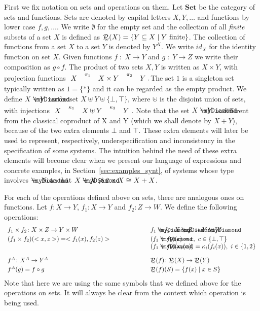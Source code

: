 \documentclass{LMCS}
\def\pow{{\mathcal P_{\!\!\!\omega}}}
\newcommand{\myplus}{\mathbin{\rlap{$\myDiamond$}\hspace*{.01cm}\raisebox{.14ex}{$+$}}}
\theoremstyle{definition}
\theoremstyle{plain}
\theoremstyle{plain}
\theoremstyle{plain}
\theoremstyle{plain}
\theoremstyle{definition}
\theoremstyle{definition}
\begin{document}
\medskip\noindent
First we fix notation on sets and operations on them. Let
$\mathbf{Set}$ be the category of sets and functions. Sets are
denoted by capital letters $X,Y,\ldots$ and functions by lower case
$f,g,\ldots$. We write $\emptyset$ for the empty set and the collection of
all {\em finite} subsets of a set $X$ is defined as
$\pow(X) = \{Y\subseteq X\mid \mbox{\textrm{$Y$ finite}}\}$. The collection of functions from a set $X$ to a set
$Y$ is denoted by $Y^X$. We write $\mathit{id}_X$ for the identity
function on set $X$. Given functions $f\;:\; X\to Y$ and
$g\;:\;Y\to Z$ we write their composition as $g\circ f$. The product
of two sets $X,Y$ is written as $X\times Y$, with projection
functions
$\xymatrix{X&X\times
Y\ar[l]_-{\pi_1}\ar[r]^-{\pi_2}&Y}.
$The set $1$ is a singleton set typically written as $1=\{ * \}$ and
it can be regarded as the empty product. We define $X\myplus Y$ as the set
$X\uplus Y \uplus \{\bot,\top\}$, where $\uplus$ is the disjoint
union of sets, with injections
$\xymatrix{X\ar[r]^-{\kappa_1}&X
\uplus
Y &Y\ar[l]_-{\kappa_2}}$. Note that the set $X\myplus Y$ is different from the classical
coproduct of X and Y (which we shall denote by $X+Y$), because of the two extra elements $\bot$ and
$\top$.
These extra elements will later be used to represent, respectively,
underspecification and inconsistency in the specification of some
systems. The intuition behind the
need of these extra elements will become clear when we present our language
of expressions and concrete examples, in
Section~\ref{sec:examples_synt}, of systems whose type
involves $\myplus$. Note that $X \myplus X
\not\cong 2\times X \cong X+ X$. 

For each of the operations defined above on sets, there are analogous
ones on functions. Let $f\colon X\to Y$, $f_1\colon X\to Y$ and $f_2\colon Z\to W$. We
define the following operations:
\[
\begin{array}{l@{\hspace{2.3cm}}l}
f_1\times f_2 \colon X\times Z \to Y\times W & f_1\myplus f_2 \colon X\myplus
Z \to Y\myplus W\\[.6ex]
(f_1\times f_2)(<x,z>) = <f_1(x),f_2(z)> &
(f_1\myplus f_2)(c) = c,\ c\in\{\bot,\top\}\\ &
(f_1\myplus f_2)(\kappa_i(x)) = \kappa_i(f_i(x)),\ i\in\{1,2\}\\[2.4ex]
f^A \colon X^A \to Y^A & \pow(f) \colon \pow (X) \to \pow (Y)\\[.6ex]

f^A (g) = f\circ g & \pow(f)(S) = \{f(x) \mid x\in S\}
\end{array}
\]
\noindent Note that here we are using the same symbols that we defined above for the
operations on sets. It will always be clear from the context which
operation is being used.
\end{document}
